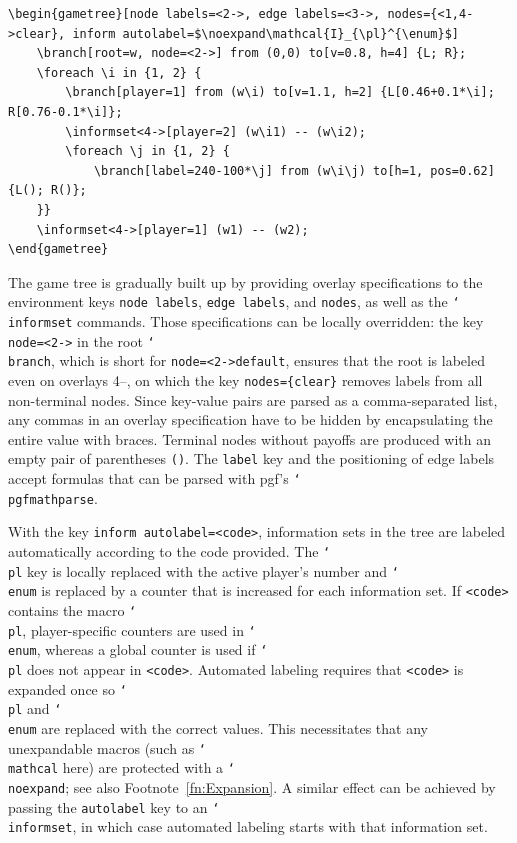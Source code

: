 \documentclass{article}
\renewcommand{\textbackslash}{\char`\\}
\def\cmd#1{\texttt{\color{cmd}\textbackslash#1}}
\def\largeskip{\vskip9pt plus 3pt minus 3pt}
\begin{document}
\begin{verbatim}
\begin{gametree}[node labels=<2->, edge labels=<3->, nodes={<1,4->clear}, inform autolabel=$\noexpand\mathcal{I}_{\pl}^{\enum}$]
	\branch[root=w, node=<2->] from (0,0) to[v=0.8, h=4] {L; R};
	\foreach \i in {1, 2} {
		\branch[player=1] from (w\i) to[v=1.1, h=2] {L[0.46+0.1*\i]; R[0.76-0.1*\i]};
		\informset<4->[player=2] (w\i1) -- (w\i2);
		\foreach \j in {1, 2} {
			\branch[label=240-100*\j] from (w\i\j) to[h=1, pos=0.62] {L(); R()};
	}}
	\informset<4->[player=1] (w1) -- (w2);
\end{gametree}
\end{verbatim}
\vspace{-1mm}

The game tree is gradually built up by providing overlay specifications to the environment keys \texttt{node labels}, \texttt{edge labels}, and \texttt{nodes}, as well as the \cmd{informset} commands. Those specifications can be locally overridden: the key \texttt{node=<2->} in the root \cmd{branch}, which is short for \texttt{node=<2->default}, ensures that the root is labeled even on overlays 4--, on which the key \texttt{nodes=\{<1,4->clear\}} removes labels from all non-terminal nodes. Since key-value pairs are parsed as a comma-separated list, any commas in an overlay specification have to be hidden by encapsulating the entire value with braces. Terminal nodes without payoffs are produced with an empty pair of parentheses \texttt{()}. The \texttt{label} key and the positioning of edge labels accept formulas that can be parsed with pgf's \cmd{pgfmathparse}.

With the key \texttt{inform autolabel=<code>}, information sets in the tree are labeled automatically according to the code provided. The \cmd{pl} key is locally replaced with the active player's number and \cmd{enum} is replaced by a counter that is increased for each information set. If \texttt{<code>} contains the macro \cmd{pl}, player-specific counters are used in \cmd{enum}, whereas a global counter is used if \cmd{pl} does not appear in \texttt{<code>}. Automated labeling requires that \texttt{<code>} is expanded once so \cmd{pl} and \cmd{enum} are replaced with the correct values. This necessitates that any unexpandable macros (such as \cmd{mathcal} here) are protected with a \cmd{noexpand}; see also Footnote~\ref{fn:Expansion}. A similar effect can be achieved by passing the \texttt{autolabel} key to an \cmd{informset}, in which case automated labeling starts with that information set.
\largeskip
\end{document}
